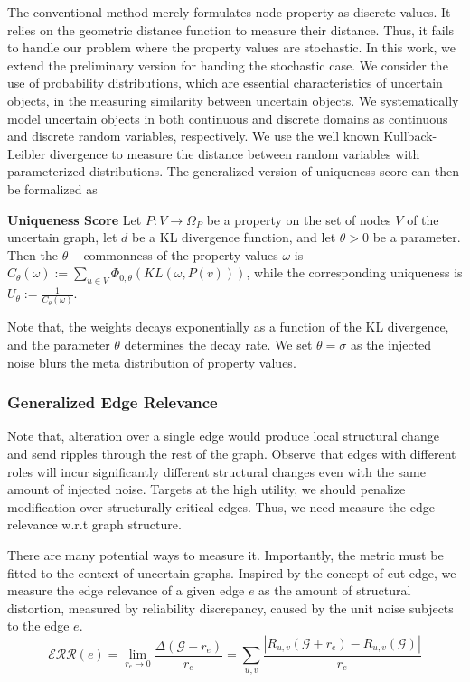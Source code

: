 The conventional method merely formulates  node property as discrete values.
It relies on the geometric distance function to measure their distance.  
Thus, it fails to handle our problem where the property values are stochastic.   
In this work, we extend the preliminary version for handing the stochastic case. 
We consider the use of probability distributions, which are essential characteristics of uncertain objects, in the measuring similarity between uncertain objects. 
We systematically model uncertain objects in both continuous and discrete domains as continuous and discrete random variables, respectively.
We use the well known Kullback-Leibler divergence to measure the distance between random variables with parameterized distributions. 
The generalized version of uniqueness score can then be formalized as
\begin{definition}
    \textbf{Uniqueness Score}
     Let $P:V \rightarrow  \Omega_{P}$ be a property on the set of nodes $V$ of the uncertain graph, 
     let $d$ be a KL divergence function, and let $\theta >0$  be a parameter. 
  	 Then the $\theta-$commonness of the property values $\omega$
  	 is $C_{\theta}(\omega):= \sum_{u \in V} \Phi_{0,\theta}(KL(\omega, P(v)))$,   
	 while the corresponding uniqueness is $U_{\theta}:= \frac{1}{C_{\theta}(\omega)}$. 
	 \vspace{-2pt}
\end{definition} 
Note that, the weights decays exponentially as a function of the KL divergence, 
and the parameter $\theta$ determines the decay rate. 
We set $\theta=\sigma$ as the injected noise blurs the meta distribution of property values. 
 
\subsubsection{Generalized Edge Relevance}

Note that, alteration over a single edge would produce local structural change and send ripples through the rest of the graph. 
Observe that edges with different roles will incur significantly different structural changes even with the same amount of injected noise. 
Targets at the high utility, we should penalize modification over structurally critical edges.  Thus, we need measure the edge relevance w.r.t graph structure. 

There are many potential ways to measure it. 
Importantly, the metric must be fitted to the context of uncertain graphs.
Inspired by the concept of cut-edge, we measure the edge relevance of a given edge $e$
as the amount of structural distortion, measured by reliability discrepancy, caused by the unit noise subjects to the edge $e$. 
\begin{equation*}
    \mathcal{ERR}({e}) = \lim_{r_{e} \rightarrow 0} \frac{\Delta(\mathcal{G}+r_{e})}{r_{e}} 
                      = \sum_{u,v} \frac{|R_{u,v}(\mathcal{G}+r_{e}) -R_{u,v}(\mathcal{G})|} {r_{e}}
\end{equation*}

